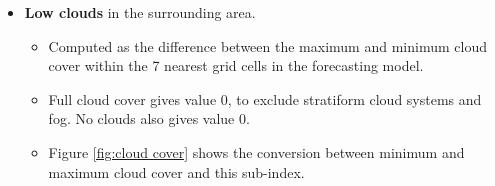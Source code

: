 \begin{itemize}
\begin{itemize}
    \end{itemize}
    \item \textbf{Low clouds} in the surrounding area.
    \begin{itemize}
        \item Computed as the difference between the maximum and minimum cloud cover within the 7 nearest grid cells in the forecasting model. 
        \item Full cloud cover gives value 0, to exclude stratiform cloud systems and fog. No clouds also gives value 0. 
        \item Figure \ref{fig:cloud cover} shows the conversion between minimum and maximum cloud cover and this sub-index.
    \end{itemize} 
\end{itemize}

